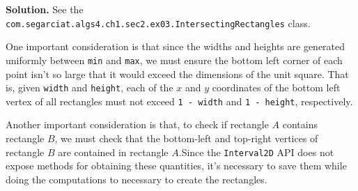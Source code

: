 \documentclass[12pt, a4paper]{article}
\newenvironment{sol}[1][Solution]
{\par\medskip\noindent \textbf{#1.} }
{\medskip}
\begin{document}
	\begin{sol}
		See the \texttt{com.segarciat.algs4.ch1.sec2.ex03.IntersectingRectangles} class.
		
		One important consideration is that since the widths and heights are generated uniformly
		between \texttt{min} and \texttt{max}, we must ensure the bottom left corner of each
		point isn't so large that it would exceed the  dimensions of the unit square.
		That is, given \texttt{width} and \texttt{height}, each of the $x$ and $y$
		coordinates of the bottom left vertex of all rectangles must not exceed
		\texttt{1 - width} and \texttt{1 - height}, respectively.
		
		Another important consideration is that, to check if rectangle $A$ contains rectangle $B$,
		we must check that the bottom-left and top-right vertices of rectangle $B$ are contained in
		rectangle $A$.Since the \texttt{Interval2D} API does not expose methods for obtaining these
		quantities, it's necessary to save them while doing the computations to necessary to create
		the rectangles.
	\end{sol}
	\pagebreak
	\printbibliography
\end{document}
